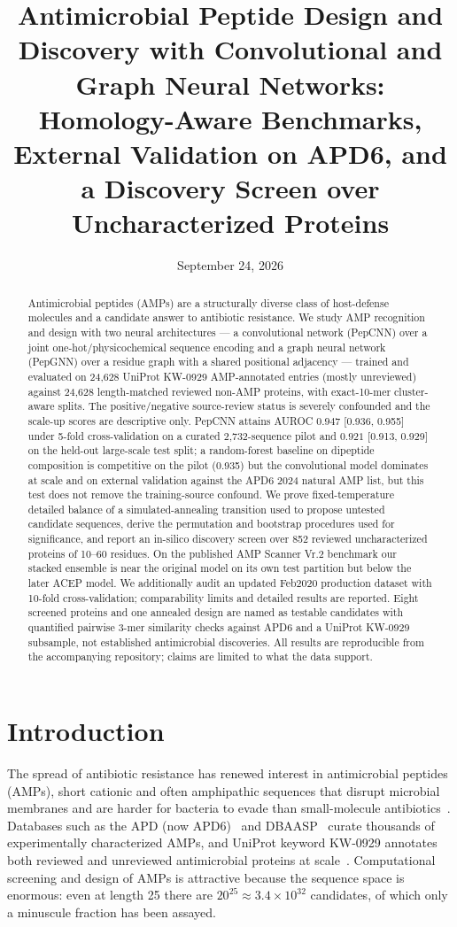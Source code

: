 \documentclass[12pt]{article}
\title{Antimicrobial Peptide Design and Discovery with Convolutional and
Graph Neural Networks: Homology-Aware Benchmarks, External Validation on
APD6, and a Discovery Screen over Uncharacterized Proteins}
\author{}
\date{September 24, 2026}
\begin{document}
\sloppy
\maketitle

\begin{abstract}
Antimicrobial peptides (AMPs) are a structurally diverse class of host-defense
molecules and a candidate answer to antibiotic resistance. We study AMP
recognition and design with two neural architectures --- a convolutional
network (PepCNN) over a joint one-hot/physicochemical sequence encoding and a
graph neural network (PepGNN) over a residue graph with a shared positional
adjacency --- trained and evaluated on 24{,}628 UniProt
KW-0929 AMP-annotated entries (mostly unreviewed) against 24{,}628
length-matched reviewed non-AMP proteins, with
exact-10-mer cluster-aware splits. The positive/negative source-review
status is severely confounded and the scale-up scores are descriptive only.
PepCNN attains AUROC $0.947$ [0.936, 0.955] under 5-fold cross-validation on a
curated 2{,}732-sequence pilot and $0.921$ [0.913, 0.929] on the held-out
large-scale test split; a random-forest baseline on dipeptide composition is
competitive on the pilot (0.935) but the convolutional model dominates at
scale and on external validation against the APD6 2024 natural AMP list,
but this test does not remove the training-source confound.
We prove fixed-temperature detailed balance of a simulated-annealing
transition used to propose untested candidate sequences, derive the permutation and bootstrap procedures
used for significance, and report an in-silico discovery screen over 852
reviewed uncharacterized proteins of 10--60 residues. On the published AMP Scanner Vr.2 benchmark our stacked ensemble is near
the original model on its own test partition but below the later ACEP model.
We additionally audit an updated Feb2020 production dataset with 10-fold
cross-validation; comparability limits and detailed results are reported. Eight screened proteins and one annealed design are named as testable
candidates with quantified pairwise 3-mer similarity checks against APD6 and
a UniProt KW-0929 subsample, not established antimicrobial discoveries. All results are
reproducible from the accompanying repository; claims are limited to what the
data support.
\end{abstract}

\section{Introduction}
The spread of antibiotic resistance has renewed interest in antimicrobial
peptides (AMPs), short cationic and often amphipathic sequences that disrupt
microbial membranes and are harder for bacteria to evade than small-molecule
antibiotics~\cite{apd3,wang2016}. Databases such as the APD (now
APD6)~\cite{apd3} and DBAASP~\cite{dbaasp} curate thousands of experimentally
characterized AMPs, and UniProt keyword KW-0929 annotates both reviewed and unreviewed
antimicrobial proteins at scale~\cite{uniprot}. Computational screening and
design of AMPs is attractive because the sequence space is enormous: even at
length 25 there are $20^{25} \approx 3.4\times 10^{32}$ candidates, of which
only a minuscule fraction has been assayed.
\end{document}
